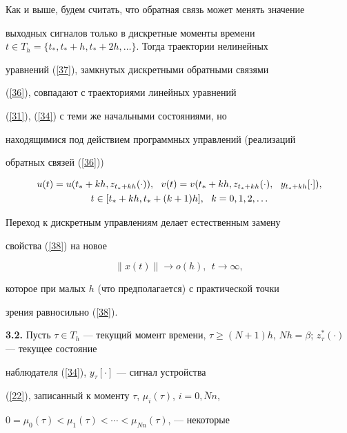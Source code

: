 Как и выше, будем считать, что обратная связь может менять значение


выходных сигналов только в дискретные моменты времени $t \in


T_h=\{t_*, t_*+h, t_*+2h, \dotsc\}$. Тогда траектории нелинейных


уравнений (\ref{37}), замкнутых дискретными обратными связями


(\ref{36}), совпадают с траекториями линейных уравнений


(\ref{31}), (\ref{34}) с теми же начальными состояниями, но


находящимися под действием программных управлений (реализаций


обратных связей (\ref{36}))


\begin{gather*}


u(t)=u(t_*+kh, z_{t_*+kh}(\cdot)),


\ \ v(t)=v(t_*+kh,z_{t_*+kh}(\cdot),\ \ y_{t_*+kh}[\cdot]),\\


%


t \in [t_*+kh,t_*+(k+1)h], \tts{[} \ \ k=0,1,2,\dotsc


\end{gather*}





Переход к дискретным управлениям делает естественным замену


свойства (\ref{38}) на новое


$$


\|x(t)\| \rightarrow o(h),\ \ t \rightarrow \infty,


$$


которое при малых $h$ (что предполагается) с практической точки


зрения равносильно (\ref{38}).


\medskip





{\bf 3.2.} Пусть $\tau \in T_h$ --- текущий момент времени, $\tau


\ge (N+1)h$, $Nh=\beta$; $z_{\tau}^*(\cdot)$ --- текущее состояние


наблюдателя (\ref{34}), $y_{\tau}[\cdot]$ --- сигнал устройства


(\ref{22}), записанный к моменту $\tau$, $\mu_i(\tau)$, $i=\overline{0,Nn}$,


$0=\mu_0(\tau)<\mu_1(\tau)<\dotsb<\mu_{Nn}(\tau)$, --- некоторые


